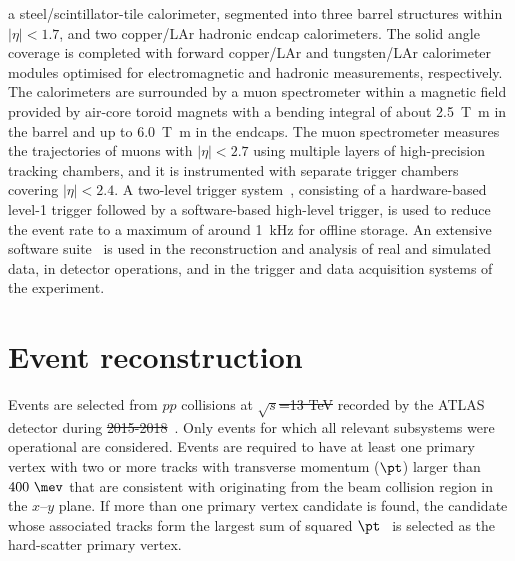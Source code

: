 \documentclass[PAPER, coverpage, atlasdraft=true, texlive=2016, UKenglish]{\ATLASLATEXPATH atlasdoc}
\providecommand{\DIFadd}[1]{{\protect\color{blue}\uwave{#1}}} %
\providecommand{\DIFdel}[1]{{\protect\color{red}\sout{#1}}}                      %
\providecommand{\DIFaddbegin}{} %
\providecommand{\DIFaddend}{} %
\providecommand{\DIFdelbegin}{} %
\providecommand{\DIFdelend}{} %
\begin{document}
a steel/scintillator-tile calorimeter, segmented into three barrel structures within $|\eta| < 1.7$, and two copper/LAr hadronic endcap calorimeters.
The solid angle coverage is completed with forward copper/LAr and tungsten/LAr calorimeter modules optimised for electromagnetic and hadronic measurements, respectively.
The calorimeters are surrounded by a muon spectrometer within a magnetic field provided by air-core toroid magnets with a bending integral of about \SI{2.5}{\tesla\metre} in the barrel and up to \SI{6.0}{\tesla\metre} in the endcaps. 
The muon spectrometer measures the trajectories of muons with $|\eta|<2.7$ using multiple layers of high-precision tracking chambers, and it is instrumented with separate trigger chambers covering $|\eta|<2.4$. A two-level trigger system~\cite{Aaboud:2016leb}, consisting of a hardware-based level-1 trigger followed by a software-based high-level trigger, is used to reduce the event rate to a maximum of around \SI{1}{\kHz} for offline storage.
An extensive software suite~\cite{ATL-SOFT-PUB-2021-001} is used in the reconstruction and analysis of real and simulated data, in detector operations, and in the trigger and data acquisition systems of the experiment.


\section{Event reconstruction}
\label{sec:objects}

Events are selected from $pp$ collisions at \DIFdelbegin \DIFdel{$\sqrt{s}$=13 TeV }\DIFdelend \DIFaddbegin \DIFadd{$\sqrt{s}=13$~}\TeV\DIFadd{\ }\DIFaddend recorded by the ATLAS detector during \DIFdelbegin \DIFdel{2015-2018}\DIFdelend \DIFaddbegin \DIFadd{2015--2018}\DIFaddend ~\cite{DAPR-2018-01}.
Only events for which all relevant subsystems were operational are considered.
Events are required to have at least one primary vertex with two or more tracks with transverse momentum
($\pt$) larger than $400~\mev$ that are consistent with originating from the 
beam collision region in the $x$--$y$ plane. If more than one primary vertex candidate is found, the
candidate whose associated tracks form the largest sum of squared $\pt$~\cite{ATL-PHYS-PUB-2015-026}
is selected as the hard-scatter primary vertex.
\end{document}

